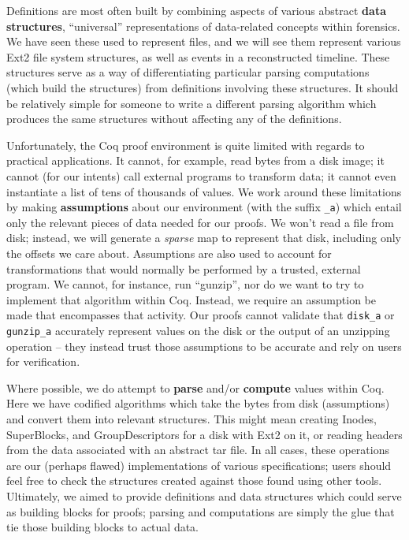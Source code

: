 \documentclass[nocopyrightspace]{sigplanconf}
\begin{document}
Definitions are most often built by combining aspects of various abstract {\bf
data structures}, ``universal'' representations of data-related concepts
within forensics. We have seen these used to represent files, and we will see
them represent various Ext2 file system structures, as well as events in a
reconstructed timeline. These structures serve as a way of differentiating
particular parsing computations (which build the structures) from definitions
involving these structures. It should be relatively simple for someone to
write a different parsing algorithm which produces the same structures without
affecting any of the definitions.

Unfortunately, the Coq proof environment is quite limited with regards to
practical applications. It cannot, for example, read bytes from a disk image;
it cannot (for our intents) call external programs to transform data; it
cannot even instantiate a list of tens of thousands of values. We work around
these limitations by making {\bf assumptions} about our environment (with the
suffix {\tt \_a}) which entail only the relevant pieces of data needed for our
proofs. We won't read a file from disk; instead, we will generate a {\it
sparse} map to represent that disk, including only the offsets we care about.
Assumptions are also used to account for transformations that would normally
be performed by a trusted, external program. We cannot, for instance, run
``gunzip'', nor do we want to try to implement that algorithm within Coq.
Instead, we require an assumption be made that encompasses that activity. Our
proofs cannot validate that {\tt disk\_a} or {\tt gunzip\_a} accurately
represent values on the disk or the output of an unzipping operation -- they
instead trust those assumptions to be accurate and rely on users for
verification.

Where possible, we do attempt to {\bf parse} and/or {\bf compute} values
within Coq. Here we have codified algorithms which take the bytes from disk
(assumptions) and convert them into relevant structures. This might mean
creating Inodes, SuperBlocks, and GroupDescriptors for a disk with Ext2 on it,
or reading headers from the data associated with an abstract tar file. In all
cases, these operations are our (perhaps flawed) implementations of various
specifications; users should feel free to check the structures created against
those found using other tools. Ultimately, we aimed to provide definitions and
data structures which could serve as building blocks for proofs; parsing and
computations are simply the glue that tie those building blocks to actual
data.
\end{document}
